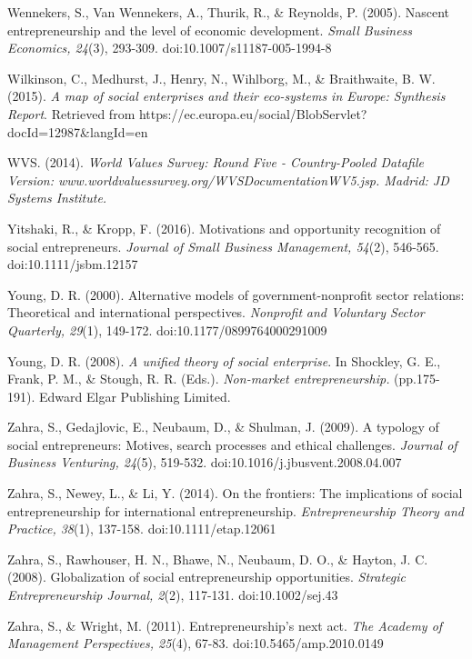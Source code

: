 \documentclass{article}
\begin{document}
Wennekers, S., Van Wennekers, A., Thurik, R., \& Reynolds, P. (2005). Nascent entrepreneurship and the level of economic development. \emph{Small Business Economics, 24}(3), 293-309. doi:10.1007/s11187-005-1994-8

Wilkinson, C., Medhurst, J., Henry, N., Wihlborg, M., \& Braithwaite, B. W. (2015). \emph{A map of social enterprises and their eco-systems in Europe: Synthesis Report}. Retrieved from https://ec.europa.eu/social/BlobServlet?docId=12987\&langId=en

WVS. (2014). \emph{World Values Survey: Round Five - Country-Pooled Datafile Version: www.worldvaluessurvey.org/WVSDocumentationWV5.jsp. Madrid: JD Systems Institute.} 

Yitshaki, R., \& Kropp, F. (2016). Motivations and opportunity recognition of social entrepreneurs. \emph{Journal of Small Business Management, 54}(2), 546-565. doi:10.1111/jsbm.12157

Young, D. R. (2000). Alternative models of government-nonprofit sector relations: Theoretical and international perspectives. \emph{Nonprofit}\emph{ and Voluntary Sector Quarterly, 29}(1), 149-172. doi:10.1177/0899764000291009

Young, D. R. (2008). \emph{A unified theory of social enterprise}. In Shockley, G. E., Frank, P. M., \& Stough, R. R. (Eds.). \emph{Non-market entrepreneurship. }(pp.175-191). Edward Elgar Publishing Limited. 

Zahra, S., Gedajlovic, E., Neubaum, D., \& Shulman, J. (2009). A typology of social entrepreneurs: Motives, search processes and ethical challenges. \emph{Journal of Business Venturing, 24}(5), 519-532. doi:10.1016/j.jbusvent.2008.04.007

Zahra, S., Newey, L., \& Li, Y. (2014). On the frontiers: The implications of social entrepreneurship for international entrepreneurship. \emph{Entrepreneurship Theory and Practice, 38}(1), 137-158. doi:10.1111/etap.12061

Zahra, S., Rawhouser, H. N., Bhawe, N., Neubaum, D. O., \& Hayton, J. C. (2008). Globalization of social entrepreneurship opportunities. \emph{Strategic Entrepreneurship Journal, 2}(2), 117-131. doi:10.1002/sej.43

Zahra, S., \& Wright, M. (2011). Entrepreneurship's next act. \emph{The Academy of Management Perspectives, 25}(4), 67-83. doi:10.5465/amp.2010.0149
\end{document}
